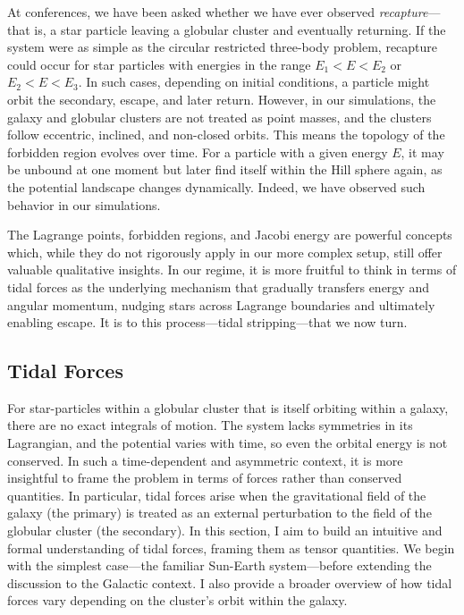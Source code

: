         At conferences, we have been asked whether we have ever observed \textit{recapture}—that is, a star particle leaving a globular cluster and eventually returning. If the system were as simple as the circular restricted three-body problem, recapture could occur for star particles with energies in the range \( E_1 < E < E_2 \) or \( E_2 < E < E_3 \). In such cases, depending on initial conditions, a particle might orbit the secondary, escape, and later return. However, in our simulations, the galaxy and globular clusters are not treated as point masses, and the clusters follow eccentric, inclined, and non-closed orbits. This means the topology of the forbidden region evolves over time. For a particle with a given energy \( E \), it may be unbound at one moment but later find itself within the Hill sphere again, as the potential landscape changes dynamically. Indeed, we have observed such behavior in our simulations.

        The Lagrange points, forbidden regions, and Jacobi energy are powerful concepts which, while they do not rigorously apply in our more complex setup, still offer valuable qualitative insights. In our regime, it is more fruitful to think in terms of tidal forces as the underlying mechanism that gradually transfers energy and angular momentum, nudging stars across Lagrange boundaries and ultimately enabling escape. It is to this process—tidal stripping—that we now turn.


    \subsection{Tidal Forces}\label{sec:tidalForce}
        For star-particles within a globular cluster that is itself orbiting within a galaxy, there are no exact integrals of motion. The system lacks symmetries in its Lagrangian, and the potential varies with time, so even the orbital energy is not conserved. In such a time-dependent and asymmetric context, it is more insightful to frame the problem in terms of forces rather than conserved quantities. In particular, tidal forces arise when the gravitational field of the galaxy (the primary) is treated as an external perturbation to the field of the globular cluster (the secondary). In this section, I aim to build an intuitive and formal understanding of tidal forces, framing them as tensor quantities. We begin with the simplest case—the familiar Sun-Earth system—before extending the discussion to the Galactic context. I also provide a broader overview of how tidal forces vary depending on the cluster's orbit within the galaxy.


